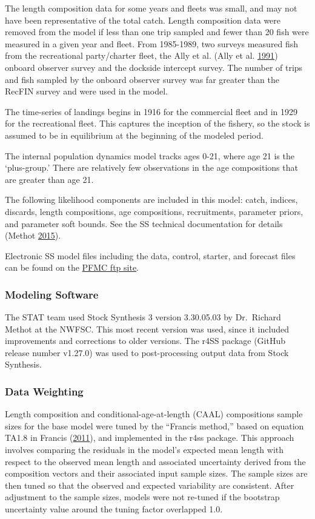 \documentclass[12pt,]{article}
\begin{document}
The length composition data for some years and fleets was small, and may
not have been representative of the total catch. Length composition data
were removed from the model if less than one trip sampled and fewer than
20 fish were measured in a given year and fleet. From 1985-1989, two
surveys measured fish from the recreational party/charter fleet, the
Ally et al. (Ally et al. \protect\hyperlink{ref-Ally1991}{1991}) onboard
observer survey and the dockside intercept survey. The number of trips
and fish sampled by the onboard observer survey was far greater than the
RecFIN survey and were used in the model.

The time-series of landings begins in 1916 for the commercial fleet and
in 1929 for the recreational fleet. This captures the inception of the
fishery, so the stock is assumed to be in equilibrium at the beginning
of the modeled period.

The internal population dynamics model tracks ages 0-21, where age 21 is
the `plus-group.' There are relatively few observations in the age
compositions that are greater than age 21.

The following likelihood components are included in this model: catch,
indices, discards, length compositions, age compositions, recruitments,
parameter priors, and parameter soft bounds. See the SS technical
documentation for details (Methot
\protect\hyperlink{ref-Methot2015}{2015}).

Electronic SS model files including the data, control, starter, and
forecast files can be found on the
\href{ftp://ftp.pcouncil.org/pub/GF_STAR3_2017_Blue_Deacon_CAScorp/}{PFMC
ftp site}.

\subsubsection{Modeling Software}\label{modeling-software}

The STAT team used Stock Synthesis 3 version 3.30.05.03 by Dr.~Richard
Methot at the NWFSC. This most recent version was used, since it
included improvements and corrections to older versions. The r4SS
package (GitHub release number v1.27.0) was used to post-processing
output data from Stock Synthesis.

\subsubsection{Data Weighting}\label{data-weighting}

Length composition and conditional-age-at-length (CAAL) compositions
sample sizes for the base model were tuned by the ``Francis method,''
based on equation TA1.8 in Francis
(\protect\hyperlink{ref-Francis2011}{2011}), and implemented in the r4ss
package. This approach involves comparing the residuals in the model's
expected mean length with respect to the observed mean length and
associated uncertainty derived from the composition vectors and their
associated input sample sizes. The sample sizes are then tuned so that
the observed and expected variability are consistent. After adjustment
to the sample sizes, models were not re-tuned if the bootstrap
uncertainty value around the tuning factor overlapped 1.0.
\end{document}
